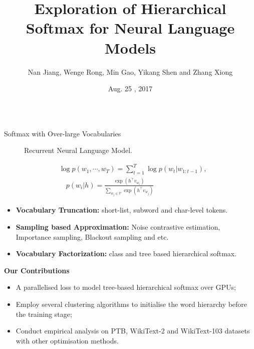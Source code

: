 \documentclass[final,t,unknownkeysallowed]{beamer}
\title{\Huge Exploration of Hierarchical Softmax for Neural Language Models}
\author{Nan Jiang, Wenge Rong, Min Gao, Yikang Shen and Zhang Xiong}
\institute[School of ECE]{Beihang University, Chongqing University and Universite de Montreal }
\date[Aug. 25 , 2017]{Aug. 25 , 2017}
\begin{document}
\begin{frame}{}
  \begin{columns}[t]
    \begin{column}{.3\linewidth}

      \begin{block}{Softmax with Over-large Vocabularies}
      \begin{figure}
      \caption{Recurrent Neural Language Model.}
      \end{figure}
      \begin{equation}\begin{split}
         &\log p(w_1,\cdots, w_T ) = \sum_{t=1}^T \log p(w_t | w_{1:t-1}), \\
         &\quad p(w_i|h)=\frac{\exp(h^\top v_{w_i})}{\sum_{w_j\in \mathcal{V}}{\exp(h^\top v_{w_j} )}}
    \end{split}
    \end{equation}
    \begin{itemize}
	\item \textbf{Vocabulary Truncation:} short-list, subword and char-level tokens.
	\item \textbf{Sampling based Approximation:} Noise contrastive estimation, Importance sampling, Blackout sampling and etc.
	\item \textbf{Vocabulary Factorization:} class and tree based hierarchical softmax.
    \end{itemize}
      \end{block}
      \textbf{Our Contributions}
	\begin{itemize}
	\item A parallelised loss to model tree-based hierarchical softmax over GPUs;
    \item Employ several clustering algorithms to initialise the word hierarchy before the training stage;
    \item Conduct empirical analysis on PTB, WikiText-2 and WikiText-103 datasets with other optimisation methods.
	\end{itemize}



\end{column}
\end{columns}
\end{frame}
\end{document}
